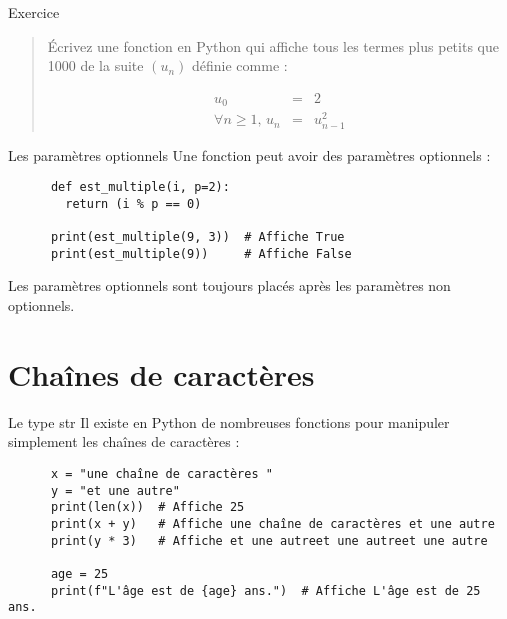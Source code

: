 \documentclass[10pt]{beamer}
\begin{document}
\begin{frame}{Exercice}
  \begin{quote}
    Écrivez une fonction en Python qui affiche tous les termes plus petits que 1000 de la suite $(u_n)$ définie comme :

$$
\begin{array}{rcc}u_0 & = & 2 \\
\forall n \geq 1, \, u_n & = & u_{n-1}^2\end{array}
$$
  \end{quote}
\end{frame}

\begin{frame}[fragile]{Les paramètres optionnels}  
  Une fonction peut avoir des paramètres optionnels :
    
    \begin{beamercodeblock}
      \begin{verbatim}
      def est_multiple(i, p=2):
        return (i % p == 0)
      
      print(est_multiple(9, 3))  # Affiche True
      print(est_multiple(9))     # Affiche False
      \end{verbatim}
    \end{beamercodeblock}

  Les paramètres optionnels sont toujours placés \alert{après} les paramètres non optionnels.
\end{frame}


\section{Chaînes de caractères}

\begin{frame}[fragile]{Le type str}  
  Il existe en Python de nombreuses fonctions pour manipuler simplement les chaînes de caractères :
    
    \begin{beamercodeblock}
      \begin{verbatim}
      x = "une chaîne de caractères "
      y = "et une autre"
      print(len(x))  # Affiche 25
      print(x + y)   # Affiche une chaîne de caractères et une autre
      print(y * 3)   # Affiche et une autreet une autreet une autre

      age = 25
      print(f"L'âge est de {age} ans.")  # Affiche L'âge est de 25 ans.
      \end{verbatim}
    \end{beamercodeblock}
\end{frame} 
\end{document}

